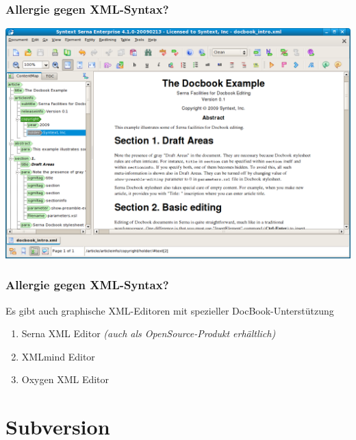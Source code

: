 \documentclass{beamer}
\begin{document}
\begin{frame}
\frametitle{Allergie gegen XML-Syntax?}
\begin{center}
\includegraphics[width=\linewidth]{serna-screenshot}
\end{center}
\end{frame}

\begin{frame}
\frametitle{Allergie gegen XML-Syntax?}
Es gibt auch graphische XML-Editoren mit spezieller DocBook-Unterstützung
\begin{enumerate}
\item Serna XML Editor \emph{(auch als OpenSource-Produkt erhältlich)}
\item XMLmind Editor
\item Oxygen XML Editor
\end{enumerate}
\end{frame}


\section{Subversion}
\end{document}
